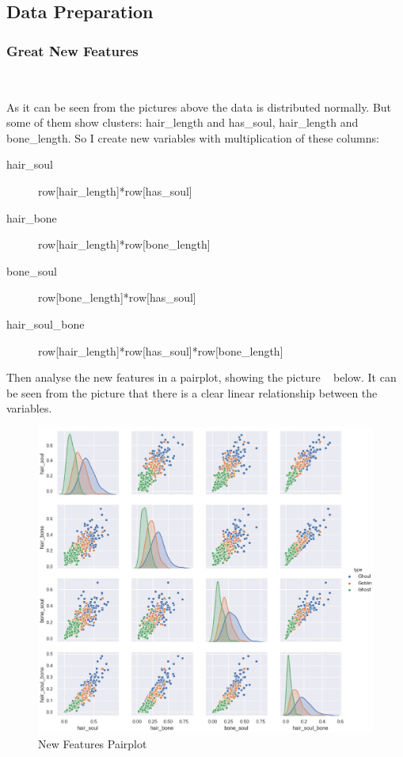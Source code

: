 \subsection{Data Preparation}

\subsubsection{Great New Features}
\

As it can be seen from 
the pictures above 
the data is distributed normally. 
But some of them show clusters: 
hair\_length and has\_soul, 
hair\_length and bone\_length. 
So I create new variables 
with multiplication of these columns: 

\begin{description}
	\item[hair\_soul] row[hair\_length]*row[has\_soul] 
	\item[hair\_bone]  row[hair\_length]*row[bone\_length] 
	\item[bone\_soul]  row[bone\_length]*row[has\_soul] 
	\item[hair\_soul\_bone]  row[hair\_length]*row[has\_soul]*row[bone\_length] 
\end{description}


Then analyse the new features in a pairplot, 
showing the picture ~
below. 
It can be seen from the picture that 
there is a clear linear relationship 
between the variables. 


\begin{figure}[htbp]
	\centering
	\includegraphics[scale=0.3]{figures/hist_1.eps}
	\caption{New Features Pairplot}\label{fig:new_pairplot}
\end{figure}


